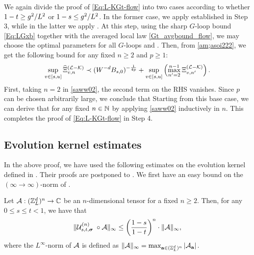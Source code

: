 We again divide the proof of \eqref{Eq:L-KGt-flow} into two cases according to whether $1-t \ge \ilambda^2/L^{2}$ or $1-s \le \ilambda^2/L^{2}$. In the former case, we apply  established in Step 3, while in the latter we apply . 
At this step, using the sharp $G$-loop bound \eqref{Eq:LGxb} together with the averaged local law \eqref{Gt_avgbound_flow}, we may choose the optimal parameters  for all $G$-loops and . Then, from \eqref{am;asoi222}, we get the following bound for any fixed $n\ge 2$ and $p\ge 1$: 
 \begin{align} \label{saww02}
 \sup_{v\in[s,u]}\wh\Xi_{v,n}^{(\mathcal{L}-\mathcal{K})}  \prec (W^{-d}B_{s,0})^{-\frac{1}{4p}}+ \sup_{v\in [s,u]}
  \left(\max_{n'=2}^{n-1}\Xi^{({\cal L-\cal K})}_{v,n'} \right).
\end{align}
First, taking $n=2$ in \eqref{saww02}, the second term on the RHS vanishes. Since $p$ can be chosen arbitrarily large, we conclude that  
Starting from this base case, we can derive that  
for any fixed $n\in\N$ by applying \eqref{saww02} inductively in $n$. This completes the proof of \eqref{Eq:L-KGt-flow} in Step 4.

\subsection{Evolution kernel estimates}\label{ks-statements}

In the above proof, we have used the following estimates on the evolution kernel defined in . Their proofs are postponed to . We first have an easy bound on the $({\infty\to \infty})$-norm of . 

 \begin{lemma}\label{lem:sum_Ndecay}
	 	Let ${\cal A}: (\Zn)^{n}\to \mathbb C$ be an $n$-dimensional tensor for a fixed $n\ge 2$. Then, for any $0\le s \le t < 1$, we have that 
	 	\begin{align}\label{sum_res_Ndecay}
		 		\| {\cal U}^{(n)}_{s,t,\bsig}\;\circ {\cal A}\|_{\infty} \le \left(  \frac{1-s}{1-t}\right)^{n }\cdot \|{\cal A}\|_{\infty} , 
		 	\end{align}
	 	where the $L^\infty$-norm of ${\cal A}$ is defined as $\|{\cal A}\|_{\infty}=\max_{\ba\in (\Zn)^n}|\cal A_{\ba}|$.
	 \end{lemma}


